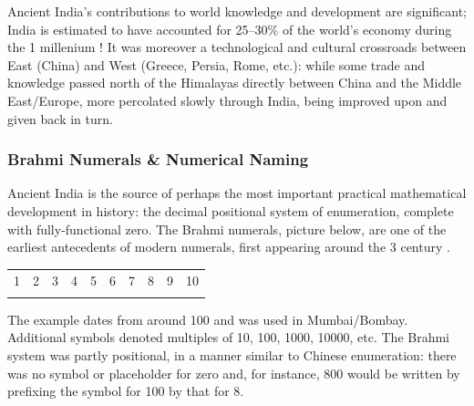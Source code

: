 Ancient India's contributions to world knowledge and development are significant; India is estimated to have accounted for 25--30\% of the world's economy during the 1\st{} millenium \!\AD\!! It was moreover a technological and cultural crossroads between East (China) and West (Greece, Persia, Rome, etc.): while some trade and knowledge passed north of the Himalayas directly between China and the Middle East/Europe, more percolated slowly through India, being improved upon and given back in turn.


% 
% 
% 
% 
% 

\subsubsection*{Brahmi Numerals \& Numerical Naming}

Ancient India is the source of perhaps the most important practical mathematical development in history: the decimal positional system of enumeration, complete with fully-functional zero. The Brahmi numerals, picture below, are one of the earliest antecedents of modern numerals, first appearing around the 3\rd{} century \BC{}.
\begin{center}
	\begin{tabular}{cccccccccc}
		1&2&3&4&5&6&7&8&9&10\\
		\IndiaBone&\IndiaBtwo&\IndiaBthree&\IndiaBfour&\IndiaBfive&\IndiaBsix&\IndiaBseven&\IndiaBeight&\IndiaBnine&\IndiaBten
	\end{tabular}
\end{center}
The example dates from around 100\BC{} and was used in Mumbai/Bombay. Additional symbols denoted multiples of 10, 100, 1000, 10000, etc. The Brahmi system was partly positional, in a manner similar to Chinese enumeration: there was no symbol or placeholder for zero and, for instance, 800 would be written by prefixing the symbol for 100 by that for 8.
\smallbreak


